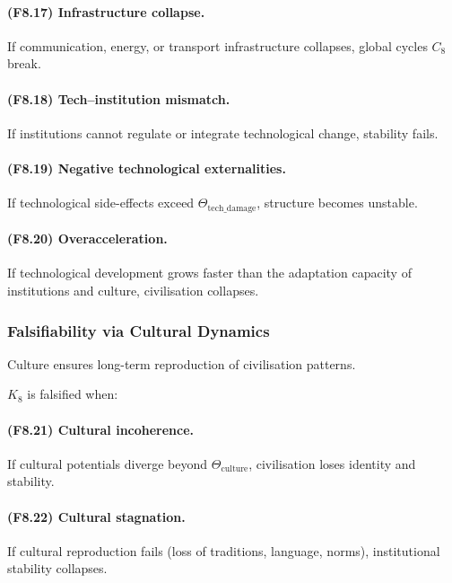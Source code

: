 \paragraph{(F8.17) Infrastructure collapse.}
If communication, energy, or transport infrastructure collapses,
global cycles $C_8$ break.

\paragraph{(F8.18) Tech–institution mismatch.}
If institutions cannot regulate or integrate technological change,
stability fails.

\paragraph{(F8.19) Negative technological externalities.}
If technological side-effects exceed $\Theta_{\mathrm{tech\_damage}}$,
structure becomes unstable.

\paragraph{(F8.20) Overacceleration.}
If technological development grows faster than the adaptation capacity
of institutions and culture, civilisation collapses.



\subsubsection{Falsifiability via Cultural Dynamics}

Culture ensures long-term reproduction of civilisation patterns.

$K_8$ is falsified when:

\paragraph{(F8.21) Cultural incoherence.}
If cultural potentials diverge beyond $\Theta_{\mathrm{culture}}$,
civilisation loses identity and stability.

\paragraph{(F8.22) Cultural stagnation.}
If cultural reproduction fails (loss of traditions, language, norms),
institutional stability collapses.

